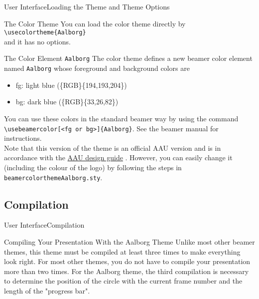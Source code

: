 \documentclass[10pt]{beamer}
\newcommand{\chref}[2]{%
  \href{#1}{{\usebeamercolor[bg]{Aalborg}#2}}%
}
\begin{document}
\begin{frame}{User Interface}{Loading the Theme and Theme Options}
  \begin{block}{The Color Theme}
    You can load the color theme directly by\\
    {\tt \textbackslash usecolortheme\{Aalborg\}}\\
    and it has no options.
  \end{block}
  \pause
  \begin{block}{The Color Element {\tt Aalborg}}
    The color theme defines a new beamer color element named {\tt Aalborg} whose foreground and background colors are
    \begin{itemize}
      \item fg: {light blue (\{RGB\}\{194,193,204\})}
      \item bg: {dark blue (\{RGB\}\{33,26,82\})}
    \end{itemize}
    You can use these colors in the standard beamer way by using the command
    {\tt \textbackslash usebeamercolor[<fg or bg>]\{Aalborg\}}. See the beamer manual for instructions.\\
 \pause Note that this version of the theme is an official AAU version and is in accordance with the \chref{http://aau.designguiden.dk/}{AAU design guide}. However, you can easily change it (including the colour of the logo) by following the steps in {\tt beamercolorthemeAalborg.sty}.
  \end{block}
\end{frame}

\subsection{Compilation}
\begin{frame}{User Interface}{Compilation}

\begin{block}{Compiling Your Presentation With the Aalborg Theme}
  Unlike most other beamer themes, this theme must be compiled at least \alert{three} times to make everything look right. For most other themes, you do not have to compile your presentation more than two times. For the Aalborg theme, the third compilation is necessary to determine the position of the circle with the current frame number and the length of the "progress bar".
\end{block}
\end{frame}
\end{document}
